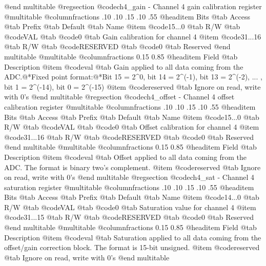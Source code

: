 @end multitable
@regsection @code{ch4_gain} - Channel 4 gain calibration register
@multitable @columnfractions .10 .10 .15 .10 .55
@headitem Bits @tab Access @tab Prefix @tab Default @tab Name
@item @code{15...0}
@tab R/W @tab
@code{VAL}
@tab @code{0} @tab 
Gain calibration for channel 4
@item @code{31...16}
@tab R/W @tab
@code{RESERVED}
@tab @code{0} @tab 
Reserved
@end multitable
@multitable @columnfractions 0.15 0.85
@headitem Field @tab Description
@item @code{val} @tab Gain applied to all data coming from the ADC.@*Fixed point format:@*Bit 15 = 2^0, bit 14 = 2^(-1), bit 13 = 2^(-2), ... , bit 1 = 2^(-14), bit 0 = 2^(-15)
@item @code{reserved} @tab Ignore on read, write with 0's
@end multitable
@regsection @code{ch4_offset} - Channel 4 offset calibration register
@multitable @columnfractions .10 .10 .15 .10 .55
@headitem Bits @tab Access @tab Prefix @tab Default @tab Name
@item @code{15...0}
@tab R/W @tab
@code{VAL}
@tab @code{0} @tab 
Offset calibration for channel 4
@item @code{31...16}
@tab R/W @tab
@code{RESERVED}
@tab @code{0} @tab 
Reserved
@end multitable
@multitable @columnfractions 0.15 0.85
@headitem Field @tab Description
@item @code{val} @tab Offset applied to all data coming from the ADC. The format is binary two's complement.
@item @code{reserved} @tab Ignore on read, write with 0's
@end multitable
@regsection @code{ch4_sat} - Channel 4 saturation register
@multitable @columnfractions .10 .10 .15 .10 .55
@headitem Bits @tab Access @tab Prefix @tab Default @tab Name
@item @code{14...0}
@tab R/W @tab
@code{VAL}
@tab @code{0} @tab 
Saturation value for channel 4
@item @code{31...15}
@tab R/W @tab
@code{RESERVED}
@tab @code{0} @tab 
Reserved
@end multitable
@multitable @columnfractions 0.15 0.85
@headitem Field @tab Description
@item @code{val} @tab Saturation applied to all data coming from the offset/gain correction block. The format is 15-bit unsigned.
@item @code{reserved} @tab Ignore on read, write with 0's
@end multitable

